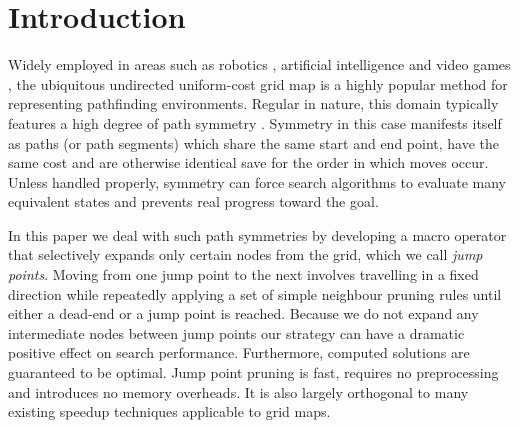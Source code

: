 \section{Introduction}
Widely employed in areas such as robotics \cite{lee09}, artificial intelligence
\cite{wang09} and video games \cite{davis00,sturtevant07}, the ubiquitous
undirected uniform-cost grid map is a highly popular method for representing
pathfinding environments.  Regular in nature, this domain typically features a
high degree of path symmetry \cite{harabor10,pochter10}.  Symmetry in this case
manifests itself as paths (or path segments) which share the same start and end
point, have the same cost and are otherwise identical save for the order in
which moves occur.  Unless handled properly, symmetry can force search
algorithms to evaluate many equivalent states and prevents real progress toward
the goal.

In this paper we deal with such path symmetries by developing a macro operator
that selectively expands only certain nodes from the grid, which we call
\emph{jump points}. Moving from one jump point to the next involves travelling
in a fixed direction while repeatedly applying a set of simple neighbour pruning
rules until either a dead-end or a jump point is reached.  Because we do not
expand any intermediate nodes between jump points our strategy can have a
dramatic positive effect on search performance.  Furthermore, computed solutions
are guaranteed to be optimal.  Jump point pruning is fast, requires no
preprocessing and introduces no memory overheads. It is also largely orthogonal to many
existing speedup techniques applicable to grid maps.

